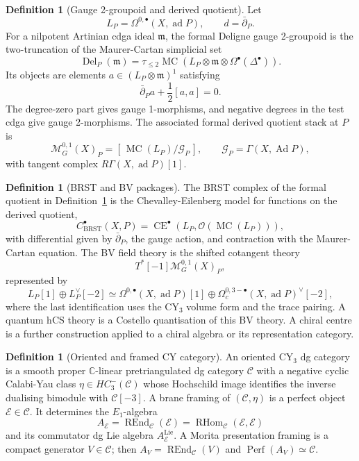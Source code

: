 \documentclass[11pt]{amsart}
\theoremstyle{plain}
\theoremstyle{definition}
\newtheorem{definition}[theorem]{Definition}
\theoremstyle{remark}
\providecommand{\C}{\mathbb{C}}
\providecommand{\cC}{\mathcal{C}}
\providecommand{\cE}{\mathcal{E}}
\providecommand{\cG}{\mathcal{G}}
\providecommand{\cM}{\mathcal{M}}
\providecommand{\cO}{\mathcal{O}}
\providecommand{\Perf}{\operatorname{Perf}}
\providecommand{\REnd}{\operatorname{REnd}}
\providecommand{\RHom}{\operatorname{RHom}}
\providecommand{\CE}{\operatorname{CE}}
\providecommand{\Del}{\operatorname{Del}}
\providecommand{\MC}{\operatorname{MC}}
\providecommand{\dbar}{\bar\partial}
\providecommand{\Eone}{E_1}
\begin{document}
\begin{definition}[Gauge 2-groupoid and derived quotient]
\label{def:gauge-2groupoid-derived-stack}
Let
\[
  L_P=\Omega^{0,\bullet}(X,\operatorname{ad}P),
  \qquad d=\dbar_P .
\]
For a nilpotent Artinian cdga ideal \(\mathfrak m\), the formal
Deligne gauge 2-groupoid is the two-truncation of the Maurer-Cartan
simplicial set
\[
  \Del_P(\mathfrak m)
  =
  \tau_{\leq2}
  \MC\!\left(
    L_P\otimes\mathfrak m\otimes\Omega^\bullet(\Delta^\bullet)
  \right).
\]
Its objects are elements \(a\in(L_P\otimes\mathfrak m)^1\) satisfying
\[
  \dbar_Pa+\frac12[a,a]=0.
\]
The degree-zero part gives gauge 1-morphisms, and negative degrees in
the test cdga give gauge 2-morphisms. The associated formal derived
quotient stack at \(P\) is
\[
  \cM^{0,1}_G(X)_P
  =
  [\,\MC(L_P)/\cG_P\,],
  \qquad
  \cG_P=\Gamma(X,\operatorname{Ad}P),
\]
with tangent complex \(R\Gamma(X,\operatorname{ad}P)[1]\).
\end{definition}

\begin{definition}[BRST and BV packages]
\label{def:brst-bv-packages}
The BRST complex of the formal quotient in
Definition~\ref{def:gauge-2groupoid-derived-stack} is the
Chevalley-Eilenberg model for functions on the derived quotient,
\[
  C^\bullet_{\mathrm{BRST}}(X,P)
  =
  \CE^\bullet\!\left(
    L_P,
    \cO(\MC(L_P))
  \right),
\]
with differential given by \(\dbar_P\), the gauge action, and
contraction with the Maurer-Cartan equation. The BV field theory is the
shifted cotangent theory
\[
  T^\ast[-1]\cM^{0,1}_G(X)_P,
\]
represented by
\[
  L_P[1]\oplus L_P^\vee[-2]
  \simeq
  \Omega^{0,\bullet}(X,\operatorname{ad}P)[1]
  \oplus
  \Omega^{0,3-\bullet}_c(X,\operatorname{ad}P)^\vee[-2],
\]
where the last identification uses the CY$_3$ volume form and the trace
pairing. A quantum hCS theory is a Costello quantisation of this BV
theory. A chiral centre is a further construction applied to a chiral
algebra or its representation category.
\end{definition}

\begin{definition}[Oriented and framed CY category]
\label{def:framed-cy-category}
An oriented CY$_3$ dg category is a smooth proper \(\C\)-linear
pretriangulated dg category \(\cC\) with a negative cyclic Calabi-Yau
class \(\eta\in HC^-_3(\cC)\) whose Hochschild image identifies the
inverse dualising bimodule with \(\cC[-3]\). A brane framing of
\((\cC,\eta)\) is a perfect object \(\cE\in\cC\). It determines the
\(\Eone\)-algebra
\[
  A_{\cE}
  =
  \REnd_{\cC}(\cE)
  =
  \RHom_{\cC}(\cE,\cE)
\]
and its commutator dg Lie algebra \(A_{\cE}^{\operatorname{Lie}}\).
A Morita presentation framing is a compact generator \(V\in\cC\);
then \(A_V=\REnd_{\cC}(V)\) and \(\Perf(A_V)\simeq\cC\).
\end{definition}
\end{document}
